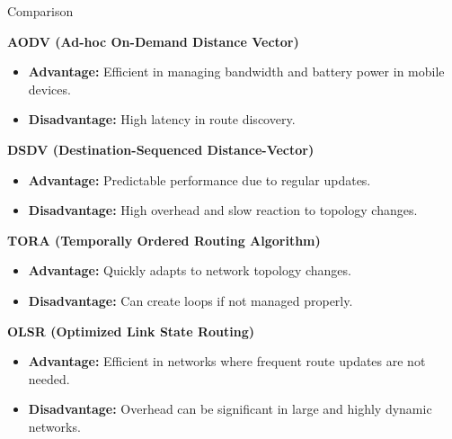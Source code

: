 \documentclass[11pt]{beamer}              %
\begin{document}
\begin{frame}{Comparison}

\noindent \textbf{AODV (Ad-hoc On-Demand Distance Vector)}
\begin{itemize}
    \item \textbf{Advantage:} Efficient in managing bandwidth and battery power in mobile devices.
    \item \textbf{Disadvantage:} High latency in route discovery.
\end{itemize}

\noindent \textbf{DSDV (Destination-Sequenced Distance-Vector)}
\begin{itemize}
    \item \textbf{Advantage:} Predictable performance due to regular updates.
    \item \textbf{Disadvantage:} High overhead and slow reaction to topology changes.
\end{itemize}

\noindent \textbf{TORA (Temporally Ordered Routing Algorithm)}
\begin{itemize}
    \item \textbf{Advantage:} Quickly adapts to network topology changes.
    \item \textbf{Disadvantage:} Can create loops if not managed properly.
\end{itemize}

\noindent \textbf{OLSR (Optimized Link State Routing)}
\begin{itemize}
    \item \textbf{Advantage:} Efficient in networks where frequent route updates are not needed.
    \item \textbf{Disadvantage:} Overhead can be significant in large and highly dynamic networks.
\end{itemize}

\end{frame}
\end{document}
